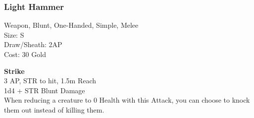 \subsubsection{Light Hammer}\label{weapon:lightHammer}
Weapon, Blunt, One-Handed, Simple, Melee\\
Size: S\\
Draw/Sheath: 2AP\\
Cost: 30 Gold

\textbf{Strike} \\
3 AP, STR to hit, 1.5m Reach\\
1d4 + \texttimes STR Blunt Damage\\
When reducing a creature to 0 Health with this Attack, you can choose to knock them out instead of killing them.
